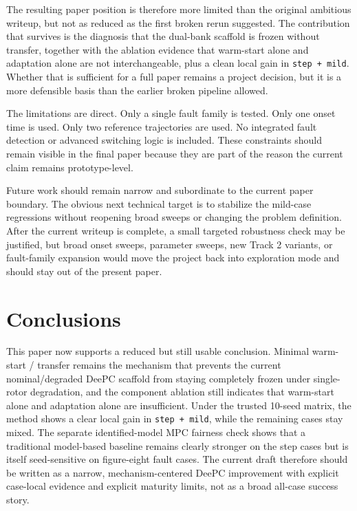 \documentclass[12pt,a4paper]{article}
\begin{document}
The resulting paper position is therefore more limited than the original ambitious writeup, but not as reduced as the first broken rerun suggested. The contribution that survives is the diagnosis that the dual-bank scaffold is frozen without transfer, together with the ablation evidence that warm-start alone and adaptation alone are not interchangeable, plus a clean local gain in \texttt{step + mild}. Whether that is sufficient for a full paper remains a project decision, but it is a more defensible basis than the earlier broken pipeline allowed.

The limitations are direct. Only a single fault family is tested. Only one onset time is used. Only two reference trajectories are used. No integrated fault detection or advanced switching logic is included. These constraints should remain visible in the final paper because they are part of the reason the current claim remains prototype-level.

Future work should remain narrow and subordinate to the current paper boundary. The obvious next technical target is to stabilize the mild-case regressions without reopening broad sweeps or changing the problem definition. After the current writeup is complete, a small targeted robustness check may be justified, but broad onset sweeps, parameter sweeps, new Track 2 variants, or fault-family expansion would move the project back into exploration mode and should stay out of the present paper.

\section{Conclusions}

This paper now supports a reduced but still usable conclusion. Minimal warm-start / transfer remains the mechanism that prevents the current nominal/degraded DeePC scaffold from staying completely frozen under single-rotor degradation, and the component ablation still indicates that warm-start alone and adaptation alone are insufficient. Under the trusted 10-seed matrix, the method shows a clear local gain in \texttt{step + mild}, while the remaining cases stay mixed. The separate identified-model MPC fairness check shows that a traditional model-based baseline remains clearly stronger on the step cases but is itself seed-sensitive on figure-eight fault cases. The current draft therefore should be written as a narrow, mechanism-centered DeePC improvement with explicit case-local evidence and explicit maturity limits, not as a broad all-case success story.
\end{document}
